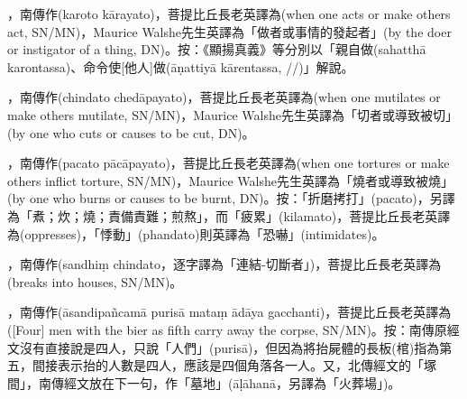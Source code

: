 \startitemgroup[noteitems]
\item{}，南傳作(karoto kārayato)，菩提比丘長老英譯為(when one acts or make others act, SN/MN)，Maurice Walshe先生英譯為「做者或事情的發起者」(by the doer or instigator of a thing, DN)。按：《顯揚真義》等分別以「親自做(sahatthā karontassa)、命令使[他人]做(āṇattiyā kārentassa, //)」解說。
\stopitemgroup

\startitemgroup[noteitems]
\item{}，南傳作(chindato chedāpayato)，菩提比丘長老英譯為(when one mutilates or make others mutilate, SN/MN)，Maurice Walshe先生英譯為「切者或導致被切」(by one who cuts or causes to be cut, DN)。
\stopitemgroup

\startitemgroup[noteitems]
\item{}，南傳作(pacato pācāpayato)，菩提比丘長老英譯為(when one tortures or make others inflict torture, SN/MN)，Maurice Walshe先生英譯為「燒者或導致被燒」(by one who burns or causes to be burnt, DN)。按：「折磨拷打」(pacato)，另譯為「煮；炊；燒；責備責難；煎熬」，而「疲累」(kilamato)，菩提比丘長老英譯為(oppresses)，「悸動」(phandato)則英譯為「恐嚇」(intimidates)。
\stopitemgroup

\startitemgroup[noteitems]
\item{}，南傳作(sandhiṃ chindato，逐字譯為「連結-切斷者」)，菩提比丘長老英譯為(breaks into houses, SN/MN)。
\stopitemgroup

\startitemgroup[noteitems]
\item{}，南傳作(āsandipañcamā purisā mataṃ ādāya gacchanti)，菩提比丘長老英譯為([Four] men with the bier as fifth carry away the corpse, SN/MN)。按：南傳原經文沒有直接說是四人，只說「人們」(purisā)，但因為將抬屍體的長板(棺)指為第五，間接表示抬的人數是四人，應該是四個角落各一人。又，北傳經文的「塚間」，南傳經文放在下一句，作「墓地」(āḷāhanā，另譯為「火葬場」)。
\stopitemgroup

